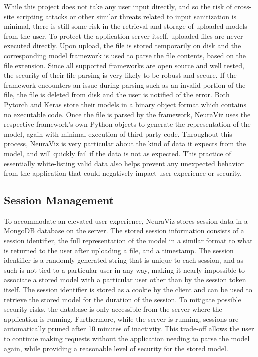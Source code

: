 While this project does not take any user input directly, and so the risk of cross-site scripting attacks or other similar threats related to input sanitization is minimal, there is still some risk in the retrieval and storage of uploaded models from the user. To protect the application server itself, uploaded files are never executed directly. Upon upload, the file is stored temporarily on disk and the corresponding model framework is used to parse the file contents, based on the file extension. Since all supported frameworks are open source and well tested, the security of their file parsing is very likely to be robust and secure. If the framework encounters an issue during parsing such as an invalid portion of the file, the file is deleted from disk and the user is notified of the error. Both Pytorch and Keras store their models in a binary object format which contains no executable code. Once the file is parsed by the framework, NeuraViz uses the respective framework's own Python objects to generate the representation of the model, again with minimal execution of third-party code. Throughout this process, NeuraViz is very particular about the kind of data it expects from the model, and will quickly fail if the data is not as expected. This practice of essentially white-listing valid data also helps prevent any unexpected behavior from the application that could negatively impact user experience or security.

\subsection{Session Management}
To accommodate an elevated user experience, NeuraViz stores session data in a MongoDB database on the server. The stored session information consists of a session identifier, the full representation of the model in a similar format to what is returned to the user after uploading a file, and a timestamp. The session identifier is a randomly generated string that is unique to each session, and as such is not tied to a particular user in any way, making it nearly impossible to associate a stored model with a particular user other than by the session token itself. The session identifier is stored as a cookie by the client and can be used to retrieve the stored model for the duration of the session. To mitigate possible security risks, the database is only accessible from the server where the application is running. Furthermore, while the server is running, sessions are automatically pruned after 10 minutes of inactivity. This trade-off allows the user to continue making requests without the application needing to parse the model again, while providing a reasonable level of security for the stored model.
